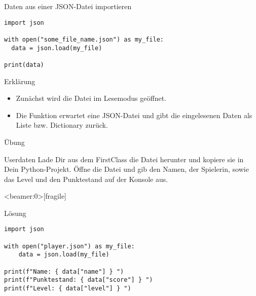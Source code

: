 \begin{fragile}
\begin{block}{Daten aus einer JSON-Datei importieren}
\vspace{2pt}

\begin{verbatim}
import json 

with open("some_file_name.json") as my_file:
  data = json.load(my_file)
  
print(data)
\end{verbatim}

\pause

\vspace{12pt}

\begin{exampleblock}{Erklärung}
\vspace{2pt}
\begin{itemize}[<+->]
\item Zunächst wird die Datei  im Lesemodus geöffnet.  
\item Die Funktion  erwartet eine JSON-Datei und gibt die eingelesenen Daten als Liste bzw. Dictionary zurück.  
\end{itemize}
\end{exampleblock}
\end{block}
\end{fragile}



\begin{frame}{Übung}
\begin{block}{Userdaten}
\vspace{2pt}
Lade Dir aus dem FirstClass die Datei  herunter und kopiere sie in Dein Python-Projekt. 
Öffne die Datei und gib den Namen, der Spielerin, sowie das Level und den Punktestand auf der Konsole aus. 
\end{block}
\end{frame}



\begin{frame}<beamer:0>[fragile]{}
\begin{solutionblock}{Lösung}

\begin{verbatim}
import json 

with open("player.json") as my_file:
    data = json.load(my_file)

print(f"Name: { data["name"] } ")
print(f"Punktestand: { data["score"] } ")
print(f"Level: { data["level"] } ") 
\end{verbatim}
\end{solutionblock}
\end{frame}



